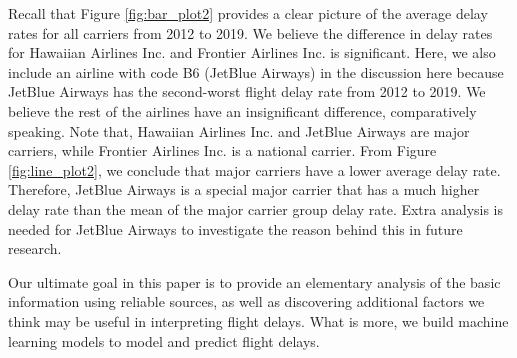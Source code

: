 \documentclass[11pt]{article}
\begin{document}
Recall that Figure \ref{fig:bar_plot2} provides a clear picture of the average delay rates for all carriers from 2012 to 2019. We believe the difference in delay rates for Hawaiian Airlines Inc. and Frontier Airlines Inc. is significant. Here, we also include an airline with code B6 (JetBlue Airways) in the discussion here because JetBlue Airways has the second-worst flight delay rate from 2012 to 2019. We believe the rest of the airlines have an insignificant difference, comparatively speaking. Note that, Hawaiian Airlines Inc. and JetBlue Airways are major carriers, while Frontier Airlines Inc. is a national carrier. From Figure \ref{fig:line_plot2}, we conclude that major carriers have a lower average delay rate. Therefore, JetBlue Airways is a special major carrier that has a much higher delay rate than the mean of the major carrier group delay rate. Extra analysis is needed for JetBlue Airways to investigate the reason behind this in future research.

Our ultimate goal in this paper is to provide an elementary analysis of the basic information using reliable sources, as well as discovering additional factors we think may be useful in interpreting flight delays. What is more, we build machine learning models to model and predict flight delays.



\end{document}
